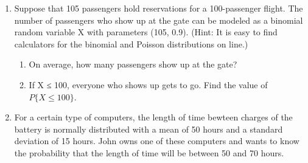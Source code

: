 \documentclass{book}
\begin{document}
\begin{enumerate}
	\item Suppose that 105 passengers hold reservations for a 100-passenger flight. The number of
passengers who show up at the gate can be modeled as a binomial random variable X with
parameters (105, 0.9). (Hint: It is easy to find calculators for the binomial and Poisson
distributions on line.)
	\begin{enumerate}
		\item On average, how many passengers show up at the gate?
		\item If X ≤ 100, everyone who shows up gets to go. Find the value of $P\{X \leq 100\}$.
	\end{enumerate}
	\item For a certain type of computers, the length of time bewteen charges of the battery is normally distributed with a mean of 50 hours and a standard deviation of 15 hours. John owns one of these computers and wants to know the probability that the length of time will be between 50 and 70 hours.
\end{enumerate}
\end{document}
